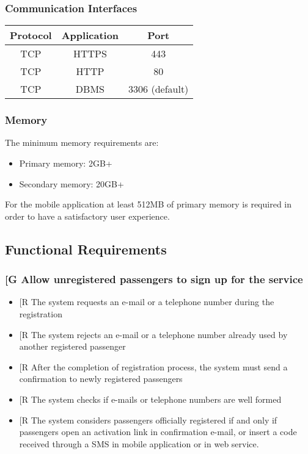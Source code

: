 \documentclass[a4paper,12pt]{article}%
\newcounter{goals_counter}
\newcounter{func_req_counter}
\begin{document}
\subsubsection{Communication Interfaces}
\begin{center}
\begin{tabular}{|c|c|c|}
\hline
Protocol & Application & Port \\
\hline \hline
TCP & HTTPS & 443 \\
\hline
TCP & HTTP & 80 \\
\hline
TCP & DBMS & 3306 (default) \\
\hline
\end{tabular}
\end{center}
\subsubsection{Memory}
The minimum memory requirements are:
\begin{itemize}
\item Primary memory: 2GB+
\item Secondary memory: 20GB+
\end{itemize}
For the mobile application at least 512MB of primary memory is required in order to have a satisfactory user experience.
\subsection{Functional Requirements}
\setcounter{goals_counter}{1}
\subsubsection{\label{goal\arabic{goals_counter}}{[}G\arabic{goals_counter}{]} Allow unregistered passengers to sign up for the service}
\begin{itemize}
\item {[}R\arabic{func_req_counter}{]} The system requests an e-mail or a telephone number during the registration
\item {[}R\arabic{func_req_counter}{]} The system rejects an e-mail or a telephone number already used by another registered passenger
\item {[}R\arabic{func_req_counter}{]} After the completion of registration process, the system must send a confirmation to newly registered passengers
\item {[}R\arabic{func_req_counter}{]} The system checks if e-mails or telephone numbers are well formed
\item {[}R\arabic{func_req_counter}{]} The system considers passengers officially registered if and only if passengers open an activation link in confirmation e-mail, or insert a code received through a SMS in mobile application or in web service.
\end{itemize}
\setcounter{func_req_counter}{1}
\end{document}

